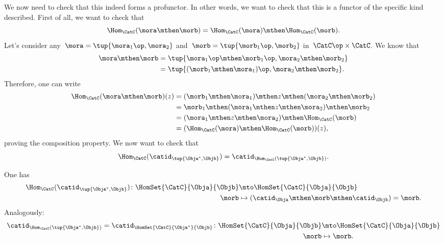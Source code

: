 
We now need to check that this indeed forms a profunctor.
In other words, we want to check that this is a functor of the specific kind described.
First of all, we want to check that
\begin{equation}
    \label{eq:hom5}
    \Hom_\CatC(\mora \mthen \morb)=\Hom_\CatC(\mora)\mthen \Hom_\CatC(\morb).
\end{equation}
Let's consider any~$\mora=\tup{\mora_1\op, \mora_2}$ and~$\morb=\tup{\morb_1\op,\morb_2}$ in~$\CatC\op \times \CatC$.
We know that
\begin{equation}
    \label{eq:hom6}
    \begin{aligned}
        \mora\mthen \morb&=\tup{\mora_1\op \mthen \morb_1\op, \mora_2\mthen \morb_2}\\
        &=\tup{(\morb_1\mthen \mora_1)\op, \mora_2\mthen \morb_2}.
    \end{aligned}
\end{equation}
Therefore, one can write
\begin{equation}
    \label{eq:hom7}
    \begin{aligned}
        \Hom_\CatC(\mora \mthen \morb)(z)&=(\morb_1\mthen \mora_1)\mthen z \mthen (\mora_2\mthen \morb_2)\\
        &=\morb_1\mthen (\mora_1\mthen z \mthen \mora_2) \mthen \morb_2\\
        &=(\mora_1\mthen z \mthen \mora_2)\mthen \Hom_\CatC(\morb)\\
        &=(\Hom_\CatC(\mora)\mthen \Hom_\CatC(\morb))(z),
    \end{aligned}
\end{equation}
proving the composition property.
We now want to check that
\begin{equation}
    \label{eq:hom_identity}
    \Hom_\CatC(\catid_{\tup{\Obja^*,\Objb}})=\catid_{\Hom_\CatC(\tup{\Obja^*,\Objb})}.
\end{equation}

One has
%
\begin{equation*}
    \begin{aligned}
        \Hom_\CatC(\catid_{\tup{\Obja^*,\Objb}})\colon \HomSet{\CatC}{\Obja}{\Objb}&\mto \HomSet{\CatC}{\Obja}{\Objb}\\
        \morb&\mapsto (\catid_\Obja \mthen \morb \mthen \catid_\Objb)=\morb.
    \end{aligned}
\end{equation*}
%
Analogously:
%
\begin{equation*}
    \begin{aligned}
        \catid_{\Hom_\CatC(\tup{\Obja^*,\Objb})}=\catid_{\HomSet{\CatC}{\Obja^*}{\Objb}} \colon \HomSet{\CatC}{\Obja}{\Objb}&\mto \HomSet{\CatC}{\Obja}{\Objb}\\
        \morb&\mapsto \morb.
    \end{aligned}
\end{equation*}

